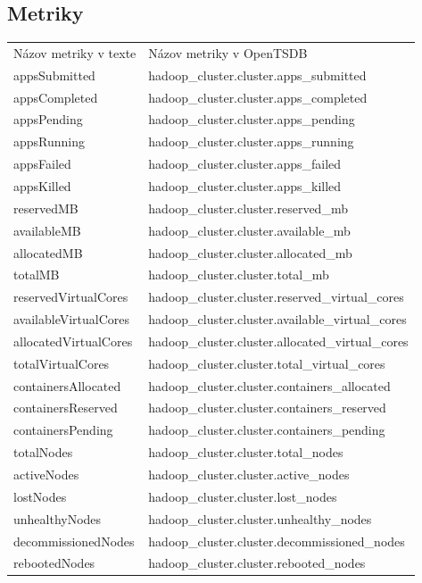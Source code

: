 \documentclass[printed,11pt,twoside,color,cover,table]{fithesis3}
\begin{document}
\subsection{Metriky}
\begin{center}
    \begin{tabular}{| l | l |}
    \hline
    Názov metriky v texte & Názov metriky v OpenTSDB \\
	appsSubmitted & hadoop\_cluster.cluster.apps\_submitted \\ \hline
    appsCompleted & hadoop\_cluster.cluster.apps\_completed \\ \hline
    appsPending & hadoop\_cluster.cluster.apps\_pending \\ \hline
    appsRunning & hadoop\_cluster.cluster.apps\_running \\ \hline 
    appsFailed & hadoop\_cluster.cluster.apps\_failed\\ \hline
    appsKilled & hadoop\_cluster.cluster.apps\_killed\\ \hline
    reservedMB & hadoop\_cluster.cluster.reserved\_mb\\ \hline
    availableMB & hadoop\_cluster.cluster.available\_mb\\ \hline
    allocatedMB & hadoop\_cluster.cluster.allocated\_mb\\ \hline
    totalMB & hadoop\_cluster.cluster.total\_mb \\ \hline
    reservedVirtualCores & hadoop\_cluster.cluster.reserved\_virtual\_cores \\ \hline
    availableVirtualCores & hadoop\_cluster.cluster.available\_virtual\_cores \\ \hline
    allocatedVirtualCores & hadoop\_cluster.cluster.allocated\_virtual\_cores \\ \hline
    totalVirtualCores & hadoop\_cluster.cluster.total\_virtual\_cores \\ \hline
    containersAllocated & hadoop\_cluster.cluster.containers\_allocated \\ \hline
    containersReserved & hadoop\_cluster.cluster.containers\_reserved \\ \hline
    containersPending & hadoop\_cluster.cluster.containers\_pending \\ \hline
    totalNodes & hadoop\_cluster.cluster.total\_nodes \\ \hline
    activeNodes & hadoop\_cluster.cluster.active\_nodes \\ \hline
    lostNodes & hadoop\_cluster.cluster.lost\_nodes \\ \hline
    unhealthyNodes & hadoop\_cluster.cluster.unhealthy\_nodes \\ \hline
    decommissionedNodes & hadoop\_cluster.cluster.decommissioned\_nodes \\ \hline
    rebootedNodes & hadoop\_cluster.cluster.rebooted\_nodes \\ \hline
    \end{tabular}
\end{center}
\end{document}
